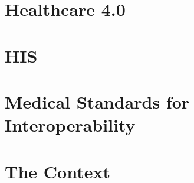 \section{Healthcare 4.0}

\section{\acl{HIS}}

\section{Medical Standards for Interoperability}

\section{The \ausl{} Context}
